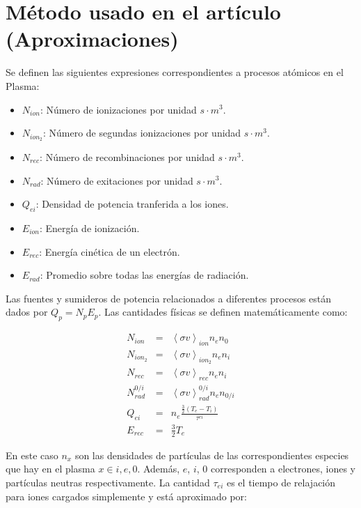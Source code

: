 \section{M\'etodo usado en el art\'iculo (Aproximaciones)}

  Se definen las siguientes expresiones correspondientes a procesos at\'omicos en el Plasma:

  \begin{itemize}
    \item $N_{ion}$: N\'umero de ionizaciones por unidad $s\cdot m^3$.
    \item $N_{ion_2}$: N\'umero de segundas ionizaciones por unidad $s\cdot m^3$.
    \item $N_{rec}$: N\'umero de recombinaciones por unidad $s\cdot m^3$.
    \item $N_{rad}$: N\'umero de exitaciones por unidad $s\cdot m^3$.
    \item $Q_{ei}$: Densidad de potencia tranferida a los iones.
    \item $E_{ion}$: Energ\'ia de ionizaci\'on.
    \item $E_{rec}$: Energ\'ia cin\'etica de un electr\'on.
    \item $E_{rad}$: Promedio sobre todas las energ\'ias de radiaci\'on.
  \end{itemize}

  Las fuentes y sumideros de potencia relacionados a diferentes procesos est\'an dados por $Q_p = N_pE_p$. Las cantidades f\'isicas se definen matem\'aticamente como:

  \begin{eqnarray}
    N_{ion} &=& \left<\sigma v\right>_{ion}n_en_0\\
    N_{ion_2} &=& \left<\sigma v\right>_{ion_2}n_en_i\\
    N_{rec} &=& \left<\sigma v\right>_{rec}n_en_i\\
    N_{rad}^{0/i} &=& \left<\sigma v\right>_{rad}^{0/i}n_en_{0/i}\\
    Q_{ei} &=& n_e\frac{\frac{3}{2}(T_e - T_i)}{\tau^{ei}} \label{eq:Qei} \\
    E_{rec} &=& \frac{3}{2}T_e
  \end{eqnarray}

  En este caso $n_x$ son las densidades de part\'iculas de las correspondientes especies que hay en el plasma $x \in {i,e,0}$. Adem\'as, $e$, $i$, $0$ corresponden a electrones, iones y part\'iculas neutras respectivamente. La cantidad $\tau_{ei}$ es el tiempo de relajaci\'on para iones cargados simplemente y est\'a aproximado por:

